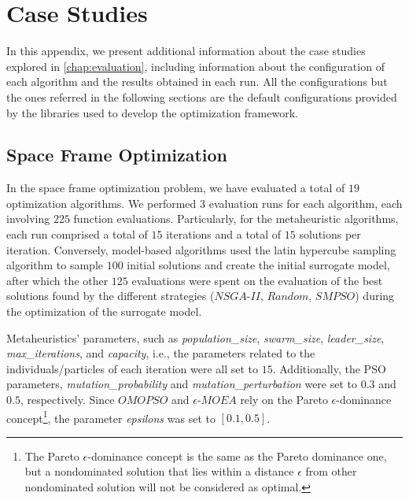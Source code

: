 \chapter{Case Studies}
\label{appendix:appendixB}

In this appendix, we present additional information about the case studies explored in \cref{chap:evaluation}, including information about the configuration of each algorithm and the results obtained in each run. All the configurations but the ones referred in the following sections are the default configurations provided by the libraries used to develop the optimization framework.


\section{Space Frame Optimization}
\label{sec:spaceframeoptimizationextra}

In the space frame optimization problem, we have evaluated a total of $19$ optimization algorithms. We performed $3$ evaluation runs for each algorithm, each involving $225$ function evaluations. Particularly, for the metaheuristic algorithms, each run comprised a total of $15$ iterations and a total of $15$ solutions per iteration. Conversely, model-based algorithms used the latin hypercube sampling algorithm to sample $100$ initial solutions and create the initial surrogate model, after which the other $125$ evaluations were spent on the evaluation of the best solutions found by the different strategies ($NSGA$-$II$, $Random$, $SMPSO$) during the optimization of the surrogate model.

Metaheuristics' parameters, such as \textit{population\_size}, \textit{swarm\_size}, \textit{leader\_size}, \textit{max\_iterations}, and \textit{capacity}, i.e., the parameters related to the individuals/particles of each iteration were all set to $15$. Additionally, the \ac{PSO} parameters, \textit{mutation\_probability} and \textit{mutation\_perturbation} were set to $0.3$ and $0.5$, respectively. Since $OMOPSO$ and $\epsilon$-$MOEA$ rely on the Pareto $\epsilon$-dominance concept\footnote{The Pareto $\epsilon$-dominance concept is the same as the Pareto dominance one, but a nondominated solution that lies within a distance $\epsilon$ from other nondominated solution will not be considered as optimal.}, the parameter \textit{epsilons} was set to $[0.1, 0.5]$.

